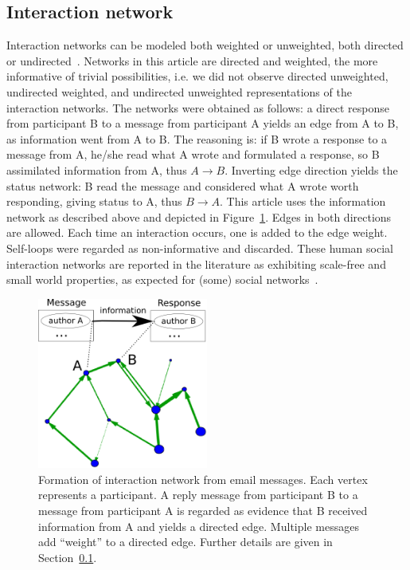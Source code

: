 \documentclass[%
 aip,
 jmp,%
 amsmath,amssymb,
 reprint,%
]{revtex4-1}
\begin{document}
\subsection{Interaction network}\label{intNet}
Interaction networks can be modeled both weighted or unweighted, both directed or undirected~\cite{bird,newmanCommunityDirected,newmanCommunity2013}.
Networks in this article are directed and weighted, the more informative of trivial possibilities, i.e. we did not observe directed unweighted, undirected weighted, and undirected unweighted representations of the interaction networks. 
The networks were obtained as follows: a direct response from participant B to a message from participant A yields an edge from A to B, as information went from A to B. The reasoning is: if B wrote a response to a message from A, he/she read what A wrote and formulated a response, so B assimilated information from A, thus $A \rightarrow B$. Inverting edge direction yields the status network: B read the message and considered what A wrote worth responding, giving status to A, thus $B\rightarrow A$. This article uses the information network as described above and depicted in Figure~\ref{formationNetwork}. Edges in both directions are allowed. Each time an interaction occurs, one is added to the edge weight. Self-loops were regarded as non-informative and discarded. These human social interaction networks are reported in the literature as exhibiting scale-free and small world properties, as expected for (some) social networks~\cite{bird,newmanBook}.

\begin{figure}[!h]
    \centering
    \includegraphics[width=0.5\textwidth]{figs/criaRede_}
    \caption{Formation of interaction network from email messages. Each vertex represents a participant. A reply message from participant B to a message from participant A is regarded as evidence that B received information from A and yields a directed edge. Multiple messages add ``weight'' to a directed edge. Further details are given in Section~\ref{intNet}.}
    \label{formationNetwork}
\end{figure}
\end{document}
